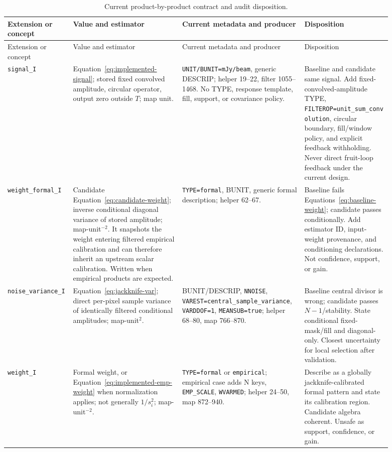 \documentclass[11pt]{article}
\newcommand{\code}[1]{\nolinkurl{#1}}
\begin{document}
\small
\begin{longtable}{L{0.15\linewidth}L{0.25\linewidth}L{0.29\linewidth}L{0.20\linewidth}}
\caption{Current product-by-product contract and audit disposition.}
\label{tab:products-current}\\
\toprule
Extension or concept & Value and estimator & Current metadata and producer & Disposition\\
\midrule
\endfirsthead
\toprule
Extension or concept & Value and estimator & Current metadata and producer & Disposition\\
\midrule
\endhead
\code{signal_I} & Equation~\eqref{eq:implemented-signal}; stored fixed convolved amplitude, circular operator, output zero outside $T$; map unit. & \code{UNIT/BUNIT=mJy/beam}, generic DESCRIP; helper 19--22, filter 1055--1468.  No TYPE, response template, fill, support, or covariance policy. & Baseline and candidate same signal.  Add fixed-convolved-amplitude TYPE, \code{FILTEROP=unit_sum_convolution}, circular boundary, fill/window policy, and explicit feedback withholding.  Never direct fruit-loop feedback under the current design.\\
\code{weight_formal_I} & Candidate Equation~\eqref{eq:candidate-weight}; inverse conditional diagonal variance of stored amplitude; map-unit$^{-2}$.  It snapshots the weight entering filtered empirical calibration and can therefore inherit an upstream scalar calibration.  Written when empirical products are expected. & \code{TYPE=formal}, BUNIT, generic formal description; helper 62--67. & Baseline fails Equations~\eqref{eq:baseline-weight}; candidate passes conditionally.  Add estimator ID, input-weight provenance, and conditioning declarations.  Not confidence, support, or gain.\\
\code{noise_variance_I} & Equation~\eqref{eq:jackknife-var}; direct per-pixel sample variance of identically filtered conditional amplitudes; map-unit$^2$. & BUNIT/DESCRIP, \code{NNOISE}, \code{VAREST=central_sample_variance}, \code{VARDDOF=1}, \code{MEANSUB=true}; helper 68--80, map 766--870. & Baseline central divisor is wrong; candidate passes $N-1$/stability.  State conditional fixed-mask/fill and diagonal-only.  Closest uncertainty for local selection after validation.\\
\code{weight_I} & Formal weight, or Equation~\eqref{eq:implemented-emp-weight} when normalization applies; not generally $1/s_i^2$; map-unit$^{-2}$. & \code{TYPE=formal} or \code{empirical}; empirical case adds N keys, \code{EMP_SCALE}, \code{WVARMED}; helper 24--50, map 872--940. & Describe as a globally jackknife-calibrated formal pattern and state its calibration region.  Candidate algebra coherent.  Unsafe as support, confidence, or gain.\\

\end{longtable}
\end{document}
